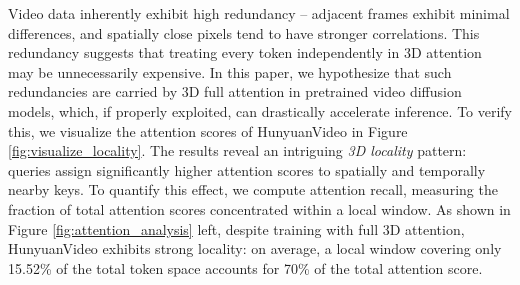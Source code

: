 
Video data inherently exhibit high redundancy -- adjacent frames exhibit minimal differences, and spatially close pixels tend to have stronger correlations. This redundancy suggests that treating every token independently in 3D attention may be unnecessarily expensive. In this paper, we hypothesize that such redundancies are carried by 3D full attention in pretrained video diffusion models, which, if properly exploited, can drastically accelerate inference. To verify this, we visualize the attention scores of HunyuanVideo in Figure \ref{fig:visualize_locality}.
The results reveal an intriguing \textit{3D locality} pattern: queries assign significantly higher attention scores to spatially and temporally nearby keys. 
To quantify this effect, we compute attention recall, measuring the fraction of total attention scores concentrated within a local window. 
As shown in Figure \ref{fig:attention_analysis} left, despite training with full 3D attention, HunyuanVideo exhibits strong locality: on average, a local window covering only 15.52\% of the total token space accounts for 70\% of the total attention score.





